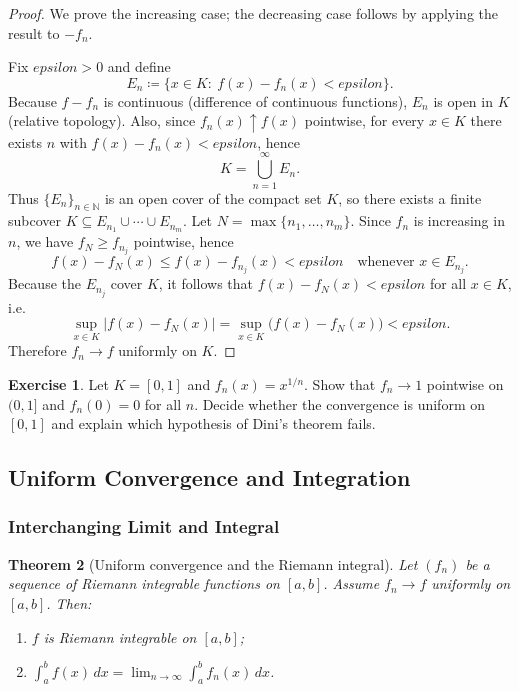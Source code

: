 \documentclass[12pt]{article}
\numberwithin{equation}{section}
\def\abs#1{|#1|}
\def\eps{epsilon}
\def\diff{d}
\newcommand{\NN}{\mathbb{N}}
\DeclarePairedDelimiter{\abs}{\lvert}{\rvert}
\newcommand{\eps}{\varepsilon}               %
\newcommand{\diff}{\mathop{}\!\mathrm{d}}    %
\theoremstyle{plain}
\newtheorem{theorem}{Theorem}[section]
\theoremstyle{definition}
\newtheorem{exercise}[theorem]{Exercise}
\theoremstyle{remark}
\begin{document}
\begin{proof}
We prove the increasing case; the decreasing case follows by applying the result to $-f_n$.

Fix $\eps>0$ and define
\[
E_n \coloneqq \{x\in K:\ f(x)-f_n(x)<\eps\}.
\]
Because $f-f_n$ is continuous (difference of continuous functions), $E_n$ is open in $K$ (relative topology).
Also, since $f_n(x)\uparrow f(x)$ pointwise, for every $x\in K$ there exists $n$ with $f(x)-f_n(x)<\eps$, hence
\[
K=\bigcup_{n=1}^\infty E_n.
\]
Thus $\{E_n\}_{n\in\NN}$ is an open cover of the compact set $K$, so there exists a finite subcover
$K\subseteq E_{n_1}\cup\cdots\cup E_{n_m}$.
Let $N=\max\{n_1,\dots,n_m\}$.
Since $f_n$ is increasing in $n$, we have $f_N\ge f_{n_j}$ pointwise, hence
\[
f(x)-f_N(x)\le f(x)-f_{n_j}(x)<\eps
\quad\text{whenever }x\in E_{n_j}.
\]
Because the $E_{n_j}$ cover $K$, it follows that $f(x)-f_N(x)<\eps$ for all $x\in K$, i.e.
\[
\sup_{x\in K}\abs{f(x)-f_N(x)}=\sup_{x\in K}\bigl(f(x)-f_N(x)\bigr)<\eps.
\]
Therefore $f_n\to f$ uniformly on $K$.
\end{proof}

\begin{exercise}
Let $K=[0,1]$ and $f_n(x)=x^{1/n}$. Show that $f_n\to 1$ pointwise on $(0,1]$ and $f_n(0)=0$ for all $n$.
Decide whether the convergence is uniform on $[0,1]$ and explain which hypothesis of Dini's theorem fails.
\end{exercise}

\newpage

\subsection{Uniform Convergence and Integration}

\subsubsection{Interchanging Limit and Integral}

\begin{theorem}[Uniform convergence and the Riemann integral]\label{thm:unif-int}
Let $(f_n)$ be a sequence of Riemann integrable functions on $[a,b]$.
Assume $f_n\to f$ uniformly on $[a,b]$.
Then:
\begin{enumerate}[label=(\alph*)]
\item $f$ is Riemann integrable on $[a,b]$;
\item $\displaystyle \int_a^b f(x)\,\diff x = \lim_{n\to\infty}\int_a^b f_n(x)\,\diff x$.
\end{enumerate}
\end{theorem}
\end{document}
